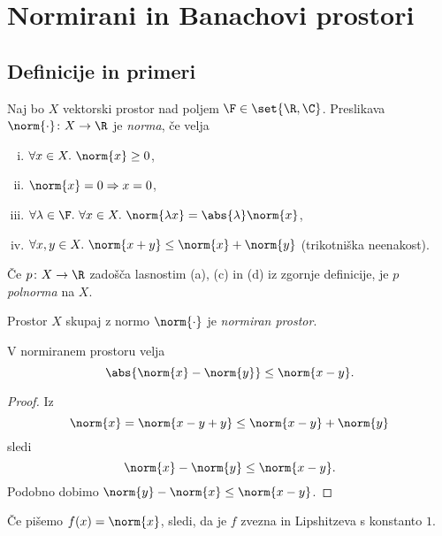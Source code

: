\section{Normirani in Banachovi prostori}
\subsection{Definicije in primeri}


\begin{definicija}
    Naj bo $X$ vektorski prostor nad poljem $\F \in \set{\R, \C}$. Preslikava 
    $\norm{\cdot} \colon X \to \R$ je \emph{norma}, če velja
    \begin{enumerate}[(i)]
        \item $\forall x \in X.~\norm{x} \ge 0$,
        \item $\norm{x} = 0 \Rightarrow x = 0$,
        \item $\forall \lambda \in \F.~\forall x \in X.~\norm{\lambda x} = \abs{\lambda} \norm{x}$,
        \item $\forall x, y \in X.~\norm{x+y} \le \norm{x} + \norm{y}$ (trikotniška neenakost).
    \end{enumerate}
\end{definicija}

\begin{definicija}
    Če $p\colon X \to \R$ zadošča lasnostim (a), (c) in (d) iz zgornje definicije, 
    je $p$ \emph{polnorma} na $X$.
\end{definicija}

\begin{definicija}
    Prostor $X$ skupaj z normo $\norm{\cdot}$ je \emph{normiran prostor}.
\end{definicija}

\begin{lema}
    V normiranem prostoru velja
    \[
        \abs{\norm{x} - \norm{y}} \le \norm{x-y}.
    \]
\end{lema}

\begin{proof}
    Iz
    \[
        \norm{x} = \norm{x-y+y} \le \norm{x-y} + \norm{y}
    \]
    sledi
    \[
        \norm{x} - \norm{y} \le \norm{x-y}.
    \]
    Podobno dobimo $\norm{y} - \norm{x} \le \norm{x-y}$.
\end{proof}

Če pišemo $f(x) = \norm{x}$, sledi, da je $f$ zvezna in Lipshitzeva 
s konstanto $1$.

